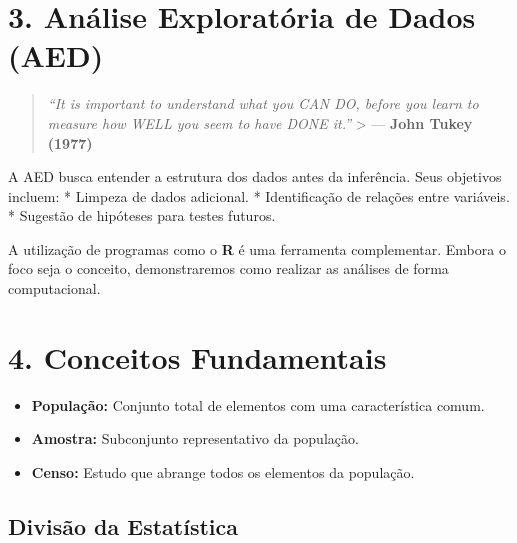 \documentclass[
  letterpaper,
  DIV=11,
  numbers=noendperiod]{scrreprt}
\providecommand{\tightlist}{%
  \setlength{\itemsep}{0pt}\setlength{\parskip}{0pt}}\usepackage{longtable,booktabs,array}
\begin{document}
\section{3. Análise Exploratória de Dados
(AED)}\label{anuxe1lise-exploratuxf3ria-de-dados-aed}

\begin{quote}
\emph{``It is important to understand what you CAN DO, before you learn
to measure how WELL you seem to have DONE it.''} \textgreater{} ---
\textbf{John Tukey (1977)}
\end{quote}

A AED busca entender a estrutura dos dados antes da inferência. Seus
objetivos incluem: * Limpeza de dados adicional. * Identificação de
relações entre variáveis. * Sugestão de hipóteses para testes futuros.

\begin{tcolorbox}[enhanced jigsaw, colframe=quarto-callout-tip-color-frame, colback=white, bottomrule=.15mm, bottomtitle=1mm, toptitle=1mm, opacitybacktitle=0.6, arc=.35mm, breakable, rightrule=.15mm, colbacktitle=quarto-callout-tip-color!10!white, titlerule=0mm, leftrule=.75mm, title=\textcolor{quarto-callout-tip-color}{\faLightbulb}\hspace{0.5em}{Nota sobre Software}, toprule=.15mm, left=2mm, opacityback=0, coltitle=black]

A utilização de programas como o \textbf{R} é uma ferramenta
complementar. Embora o foco seja o conceito, demonstraremos como
realizar as análises de forma computacional.

\end{tcolorbox}

\section{4. Conceitos Fundamentais}\label{conceitos-fundamentais}

\begin{itemize}
\tightlist
\item
  \textbf{População:} Conjunto total de elementos com uma característica
  comum.
\item
  \textbf{Amostra:} Subconjunto representativo da população.
\item
  \textbf{Censo:} Estudo que abrange todos os elementos da população.
\end{itemize}

\subsection{Divisão da Estatística}\label{divisuxe3o-da-estatuxedstica}
\end{document}

